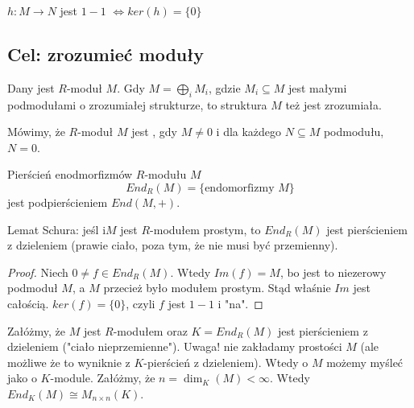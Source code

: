 \begin{theorem}$ $

\begin{center}
\end{center}

\end{theorem}

$h:M\to N$ jest $1-1$ $\iff ker(h)=\{0\}$

\subsection{Cel: zrozumieć moduły}

\begin{bbox}
Dany jest $R$-moduł $M$. Gdy $M=\bigoplus_i M_i$, gdzie $M_i\subseteq M$ jest małymi podmodułami o zrozumiałej strukturze, to struktura $M$ też jest zrozumiała.
\end{bbox}

\begin{definition}
Mówimy, że $R$-moduł $M$ jest , gdy $M\neq 0$ i dla każdego $N\subseteq M$ podmodułu, $N=0$.

Pierścień enodmorfizmów $R$-modułu $M$
$$End_R(M)=\{\text{endomorfizmy }M\}$$
jest podpierścieniem $End(M, +)$.
\end{definition}

\begin{lemma} Lemat Schura: jeśl i$M$ jest $R$-modułem prostym, to $End_R(M)$ jest pierścieniem z dzieleniem (prawie ciało, poza tym, że nie musi być przemienny).
\end{lemma}
\begin{proof}
Niech $0\neq f\in End_R(M)$. Wtedy $Im(f)=M$, bo jest to niezerowy podmoduł $M$, a $M$ przecież było modułem prostym. Stąd właśnie $Im$ jest całością. $ker(f)=\{0\}$, czyli $f$ jest $1-1$ i "na".
\end{proof}

Załóżmy, że $M$ jest $R$-modułem oraz $K=End_R(M)$ jest pierścieniem z dzieleniem ("ciało nieprzemienne"). Uwaga! nie zakładamy prostości $M$ (ale możliwe że to wyniknie z $K$-pierścień z dzieleniem). Wtedy o $M$ możemy myśleć jako o $K$-module. Załóżmy, że $n=\dim_K(M)<\infty$. Wtedy $End_K(M)\cong M_{n\times n}(K)$.


